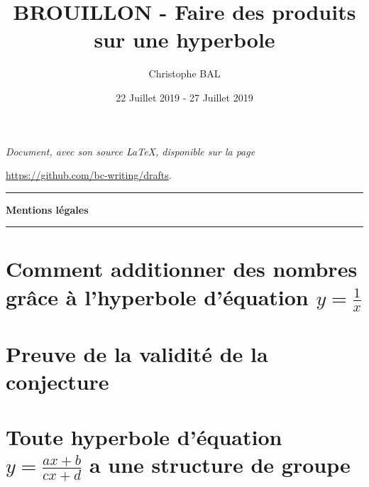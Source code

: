 \documentclass[12pt]{amsart}
\begin{document}
\title{BROUILLON - Faire des produits sur une hyperbole}
\author{Christophe BAL}
\date{22 Juillet 2019 - 27 Juillet 2019}
\maketitle


\begin{center}
	\itshape
	Document, avec son source \LaTeX, disponible sur la page
	
	\url{https://github.com/bc-writing/drafts}.
\end{center}


\bigskip


\begin{center}
	\hrule\vspace{.3em}
	{
		\fontsize{1.35em}{1em}\selectfont
		\textbf{Mentions \og légales \fg}
	}
			
	\vspace{0.45em}
	\doclicenseThis
	\hrule
\end{center}



\setcounter{tocdepth}{2}
\tableofcontents




\newpage

\section{\texorpdfstring{Comment additionner des nombres grâce à l'hyperbole d'équation $y = \frac{1}{x}$}%
                        {Comment additionner des nombres grâce à l'hyperbole d'équation y = 1/x}}





\section{Preuve de la validité de la conjecture} \label{proof}





\section{\texorpdfstring{Toute hyperbole d'équation $y = \frac{a x + b}{c x + d}$ a une structure de groupe}%
                        {Toute hyperbole d'équation y = (a x + b) / (c x + d) a une structure de groupe}}
      




\end{document}
